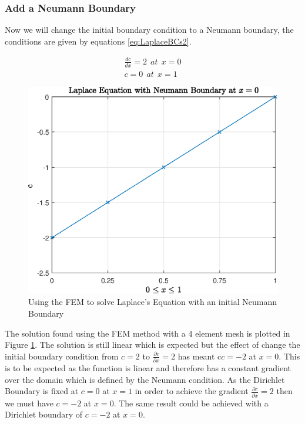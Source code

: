 \documentclass[11pt]{article}
\begin{document}
\subsubsection{Add a Neumann Boundary}
Now we will change the initial boundary condition to a Neumann boundary, the conditions are given by equations \ref{eq:LaplaceBCs2}.

\begin{subequations}\label{eq:LaplaceBCs2}
\begin{align}
\frac{dc}{dx} = 2 \ \ at \ \ x = 0 \\
c = 0 \ \ at \ \  x= 1
\end{align}
\end{subequations}

\begin{figure}[h!] 
    \centering
    \includegraphics{epsLaplaceFig2}
    \caption{Using the FEM to solve Laplace's Equation with an initial Neumann Boundary}\label{fig:LaplaceFig2}
\end{figure}

The solution found using the FEM method with a 4 element mesh is plotted in Figure \ref{fig:LaplaceFig2}. The solution is still linear which is expected but the effect of change the initial boundary condition from $c = 2$ to $\frac{\partial c}{\partial x} = 2$ has meant c$c = -2$ at $x = 0$. This is to be expected as the function is linear and therefore has a constant gradient over the domain which is defined by the Neumann condition. As the Dirichlet Boundary is fixed at $c = 0$ at $x = 1$ in order to achieve the gradient $\frac{\partial c}{\partial x} = 2$ then we must have $c = -2$ at $x = 0$. The same result could be achieved with a Dirichlet boundary of $c = -2$ at $x = 0$.
\end{document}
